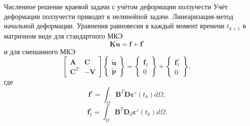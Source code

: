 \documentclass{beamer}
\begin{document}
\begin{frame}{Численное решение краевой задачи с учётом деформации ползучести}
\small
Учёт деформации ползучести приводит к нелинейной задаче. Линеаризация-метод начальной деформации. Уравнения равновесия в каждый момент времени $t_{k+1}$ в матричном виде для стандартного МКЭ
\begin{equation*}
\textbf{Ku}=\textbf{f}+\textbf{f}^{c}
\end{equation*}
и для смешанного МКЭ
\begin{equation*}	
\begin{bmatrix}
\mathbf{A} & \mathbf{C} \\
\mathbf{C}^{T} & -\mathbf{V} 
\end{bmatrix}
\begin{Bmatrix}
\tilde{\mathbf{u}} \\
\tilde{\mathbf{p}} 
\end{Bmatrix}
=
\begin{Bmatrix}
\mathbf{f}_1 \\
0
\end{Bmatrix}
+
\begin{Bmatrix}
\mathbf{f}_1^{c} \\
0
\end{Bmatrix},
\end{equation*}
где 
\begin{equation*}
\mathbf{f}^{c}=\int_{\Omega} {\mathbf{B}^{T} \mathbf{D} \bm{\varepsilon}^{c}(t_{k}) d\Omega},
\end{equation*}
\begin{equation*}
\mathbf{f}_1^{c}=\int_{\Omega} {\mathbf{B}^{T} \mathbf{D}_{d} \bm{\varepsilon}^{c}(t_{k}) d\Omega}.
\end{equation*}
\end{frame}
\end{document}
